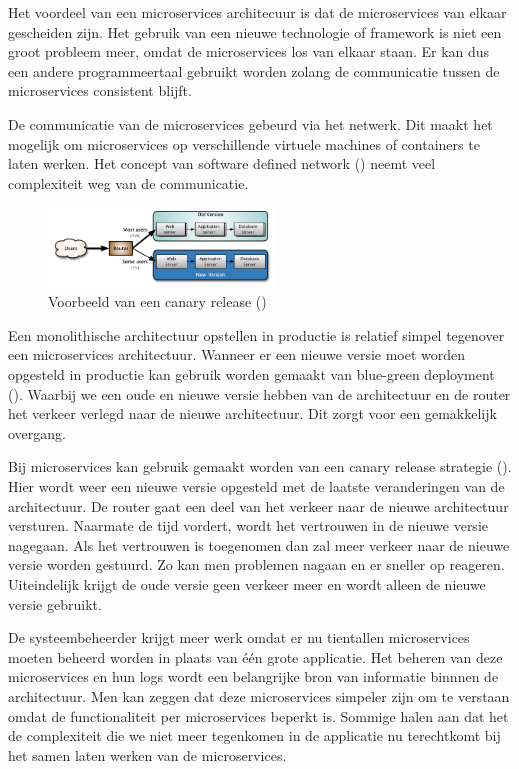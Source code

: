 \documentclass[pdftex,a4paper,12pt,twoside]{report}
\begin{document}
Het voordeel van een microservices architecuur is dat de microservices van elkaar gescheiden zijn. Het gebruik van een nieuwe technologie of framework is niet een groot probleem meer, omdat de microservices los van elkaar staan. Er kan dus een andere programmeertaal gebruikt worden zolang de communicatie tussen de microservices consistent blijft.

De communicatie van de microservices gebeurd via het netwerk. Dit maakt het mogelijk om microservices op verschillende virtuele machines of containers te laten werken. Het concept van software defined network (\cite{garcia_villalba_trends_2015}) neemt veel complexiteit weg van de communicatie.

\begin{figure}
    \centering
    \includegraphics[width=6cm]{img/canary-release}
    \caption{Voorbeeld van een canary release (\cite{danilo_sato_canaryrelease_2014})}
    \label{fig:canary-release}
\end{figure}

Een monolithische architectuur opstellen in productie is relatief simpel tegenover een microservices architectuur. Wanneer er een nieuwe versie moet worden opgesteld in productie kan gebruik worden gemaakt van blue-green deployment (\cite{martin_fowler_bluegreendeployment_2016}). Waarbij we een oude en nieuwe versie hebben van de architectuur en de router het verkeer verlegd naar de nieuwe architectuur. Dit zorgt voor een gemakkelijk overgang.

Bij microservices kan gebruik gemaakt worden van een canary release strategie (\cite{danilo_sato_canaryrelease_2014}). Hier wordt weer een nieuwe versie opgesteld met de laatste veranderingen van de architectuur. De router gaat een deel van het verkeer naar de nieuwe architectuur versturen. Naarmate de tijd vordert, wordt het vertrouwen in de nieuwe versie nagegaan. Als het vertrouwen is toegenomen dan zal meer verkeer naar de nieuwe versie worden gestuurd. Zo kan men problemen nagaan en er sneller op reageren. Uiteindelijk krijgt de oude versie geen verkeer meer en wordt alleen de nieuwe versie gebruikt.

De systeembeheerder krijgt meer werk omdat er nu tientallen microservices moeten beheerd worden in plaats van één grote applicatie. Het beheren van deze microservices en hun logs wordt een belangrijke bron van informatie binnnen de architectuur. Men kan zeggen dat deze microservices simpeler zijn om te verstaan omdat de functionaliteit per microservices beperkt is. Sommige halen aan dat het de complexiteit die we niet meer tegenkomen in de applicatie nu terechtkomt bij het samen laten werken van de microservices.
\end{document}

